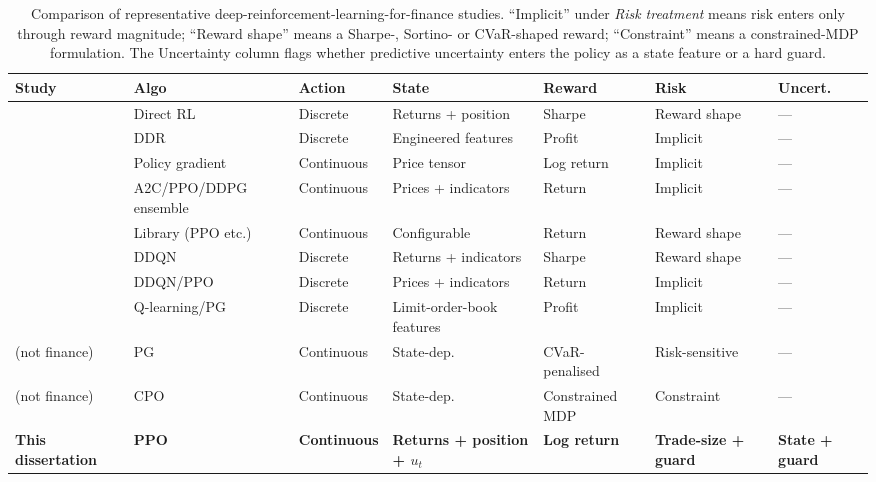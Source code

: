 \begin{table}[h]
\centering
\caption{Comparison of representative deep-reinforcement-learning-for-finance studies. ``Implicit'' under \emph{Risk treatment} means risk enters only through reward magnitude; ``Reward shape'' means a Sharpe-, Sortino- or CVaR-shaped reward; ``Constraint'' means a constrained-MDP formulation. The Uncertainty column flags whether predictive uncertainty enters the policy as a state feature or a hard guard.}
\label{tab:lit_comparison}
\footnotesize
\begin{tabular}{lllllll}
\toprule
\textbf{Study} & \textbf{Algo} & \textbf{Action} & \textbf{State} & \textbf{Reward} & \textbf{Risk} & \textbf{Uncert.} \\
\midrule
\textcite{moody2001learning} & Direct RL & Discrete & Returns + position & Sharpe & Reward shape & --- \\
\textcite{deng2017deep} & DDR & Discrete & Engineered features & Profit & Implicit & --- \\
\textcite{jiang2017deep} & Policy gradient & Continuous & Price tensor & Log return & Implicit & --- \\
\textcite{yang2020deep} & A2C/PPO/DDPG ensemble & Continuous & Prices + indicators & Return & Implicit & --- \\
\textcite{liu2021finrl} & Library (PPO etc.) & Continuous & Configurable & Return & Reward shape & --- \\
\textcite{zhang2020deep} & DDQN & Discrete & Returns + indicators & Sharpe & Reward shape & --- \\
\textcite{theate2021application} & DDQN/PPO & Discrete & Prices + indicators & Return & Implicit & --- \\
\textcite{daberius2019deep} & Q-learning/PG & Discrete & Limit-order-book features & Profit & Implicit & --- \\
\textcite{chow2015risk} (not finance) & PG & Continuous & State-dep. & CVaR-penalised & Risk-sensitive & --- \\
\textcite{achiam2017cpo} (not finance) & CPO & Continuous & State-dep. & Constrained MDP & Constraint & --- \\
\textbf{This dissertation} & \textbf{PPO} & \textbf{Continuous} & \textbf{Returns + position + $u_t$} & \textbf{Log return} & \textbf{Trade-size + guard} & \textbf{State + guard} \\
\bottomrule
\end{tabular}
\end{table}

